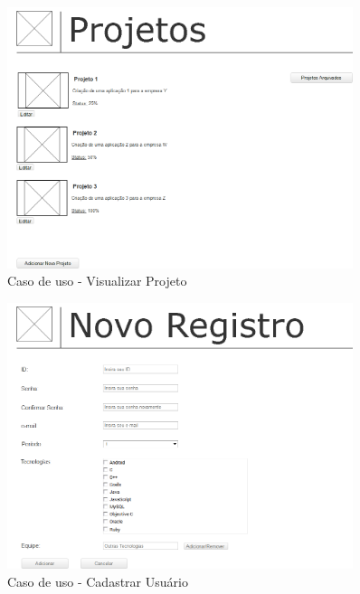 \begin{figure}[H]
  \center
  \includegraphics[width=0.9\textwidth]{figuras/Prototipo3}
  \caption{Caso de uso - Visualizar Projeto}
  \label{fig:uc-visualizar-projeto}
\end{figure}

\begin{figure}[H]
  \center
  \includegraphics[width=0.9\textwidth]{figuras/Prototipo4}
  \caption{Caso de uso - Cadastrar Usuário}
  \label{fig:uc-cadastrar-usuario}
\end{figure}

